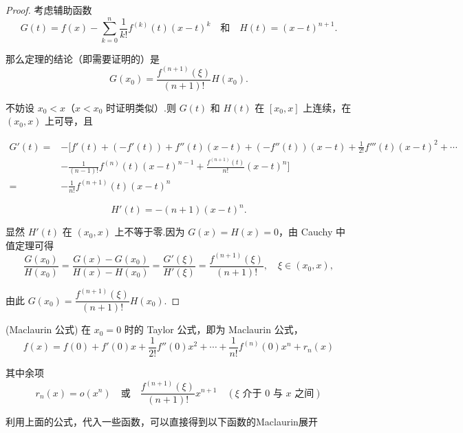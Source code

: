 \begin{proof}
	考虑辅助函数
	\[
	G(t) = f(x) - \sum_{k=0}^n \frac{1}{k!} f^{(k)}(t)(x-t)^k \quad \text{和} \quad H(t) = (x-t)^{n+1}.
	\]
	
	那么定理的结论（即需要证明的）是
	\[
	G(x_0) = \frac{f^{(n+1)}(\xi)}{(n+1)!} H(x_0).
	\]
	
	不妨设 $x_0 < x$（$x < x_0$ 时证明类似）.则 $G(t)$ 和 $H(t)$ 在 $[x_0, x]$ 上连续，在 $(x_0, x)$ 上可导，且
	
	\[\begin{aligned}
		G'(t) =& -[f'(t) + (-f'(t)) + f''(t)(x-t) + (-f''(t))(x-t)+ \frac{1}{2!} f'''(t)(x-t)^2 + \cdots\\&-\frac{1}{(n-1)!} f^{(n)}(t)(x-t)^{n-1} + \frac{f^{(n+1)}(t)}{n!}(x-t)^n]\\
		=&-\frac{1}{n!} f^{(n+1)}(t)(x-t)^n
	\end{aligned}\]
	
	\[
	H'(t) = -(n+1)(x-t)^n.
	\]
	
	显然 $H'(t)$ 在 $(x_0, x)$ 上不等于零.因为 $G(x) = H(x) = 0$，由 Cauchy 中值定理可得
	\[
	\frac{G(x_0)}{H(x_0)} = \frac{G(x) - G(x_0)}{H(x) - H(x_0)} = \frac{G'(\xi)}{H'(\xi)} = \frac{f^{(n+1)}(\xi)}{(n+1)!}, \quad \xi \in (x_0, x),
	\]
	
	由此 $G(x_0) = \dfrac{f^{(n+1)}(\xi)}{(n+1)!} H(x_0)$.
\end{proof}
\begin{corollary}(Maclaurin 公式)
	在 $x_0=0$ 时的 Taylor 公式，即为 Maclaurin 公式，
	$$
	f(x) = f(0) + f'(0)x + \frac{1}{2!} f''(0)x^2 + \cdots + \frac{1}{n!} f^{(n)}(0)x^n + r_n(x)
	$$
	
	其中余项
	$$
	r_n(x) = o(x^n) \quad \text{或} \quad \frac{f^{(n+1)}(\xi)}{(n+1)!} x^{n+1} \quad (\xi \text{ 介于 } 0 \text{ 与 } x \text{ 之间})
	$$
\end{corollary}
利用上面的公式，代入一些函数，可以直接得到以下函数的Maclaurin展开
